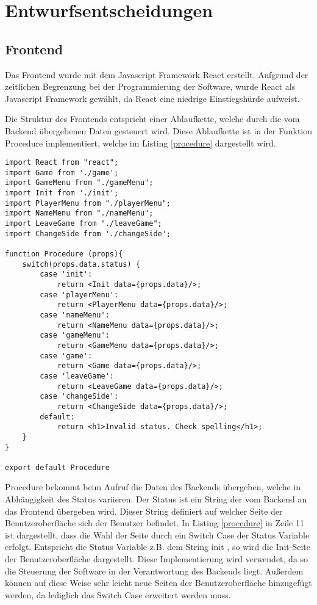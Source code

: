\chapter{Entwurfsentscheidungen}
\section{Frontend}
Das Frontend wurde mit dem Javascript Framework React erstellt. Aufgrund der zeitlichen Begrenzung bei der Programmierung der Software, wurde React als Javascript Framework gewählt, da React eine niedrige Einstiegshürde aufweist. 

Die Struktur des Frontends entspricht einer Ablaufkette, welche durch die vom Backend übergebenen Daten gesteuert wird. Diese Ablaufkette ist in der Funktion Procedure implementiert, welche im Listing \ref{procedure} dargestellt wird. 

\begin{lstlisting}[caption={Procedure Funktion des Frontends},captionpos=b]
import React from "react";
import Game from './game';
import GameMenu from "./gameMenu";
import Init from './init';
import PlayerMenu from "./playerMenu";
import NameMenu from "./nameMenu";
import LeaveGame from "./leaveGame";
import ChangeSide from './changeSide';

function Procedure (props){
    switch(props.data.status) {
        case 'init':
            return <Init data={props.data}/>;
        case 'playerMenu':
            return <PlayerMenu data={props.data}/>;
        case 'nameMenu':
            return <NameMenu data={props.data}/>;
        case 'gameMenu':
            return <GameMenu data={props.data}/>;
        case 'game':
            return <Game data={props.data}/>;
        case 'leaveGame':
            return <LeaveGame data={props.data}/>;
        case 'changeSide':
            return <ChangeSide data={props.data}/>;
        default:
            return <h1>Invalid status. Check spelling</h1>;
    }
}

export default Procedure
\end{lstlisting}
\label{procedure}

Procedure bekommt beim Aufruf die Daten des Backends übergeben, welche in Abhängigkeit des Status variieren. Der Status ist ein String der vom Backend an das Frontend übergeben wird. Dieser String definiert auf welcher Seite der Benutzeroberfläche sich der Benutzer befindet. In Listing \ref{procedure} in Zeile 11 ist dargestellt, dass die Wahl der Seite durch ein Switch Case der Status Variable erfolgt. Entspricht die Status Variable z.B. dem String \glqq init\grqq{} , so wird die Init-Seite der Benutzeroberfläche dargestellt. Diese Implementierung wird verwendet, da so die Steuerung der Software in der Verantwortung des Backends liegt. Außerdem können auf diese Weise sehr leicht neue Seiten der Benutzeroberfläche hinzugefügt werden, da lediglich das Switch Case erweitert werden muss.
